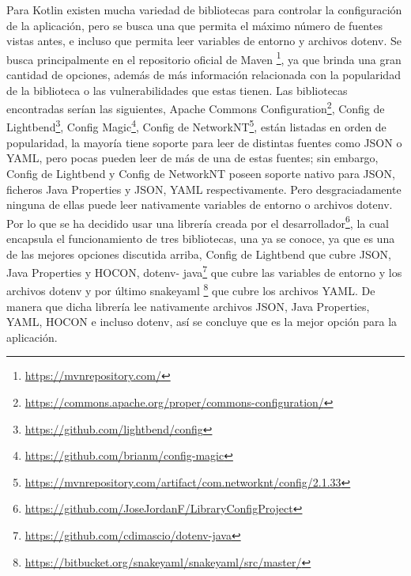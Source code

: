 Para Kotlin existen mucha variedad de bibliotecas para controlar la configuración de la aplicación, pero se busca 
una que permita el máximo número de fuentes vistas antes, e incluso que permita leer variables de entorno y archivos 
dotenv. Se busca principalmente en el repositorio oficial de Maven \footnote{\url{https://mvnrepository.com/}}, ya 
que brinda una gran cantidad de opciones, además de más información relacionada con la popularidad de la biblioteca 
o las vulnerabilidades que estas tienen. Las bibliotecas encontradas serían las siguientes, Apache Commons 
Configuration\footnote{\url{https://commons.apache.org/proper/commons-configuration/}}, Config de 
Lightbend\footnote{\url{https://github.com/lightbend/config}}, Config 
Magic\footnote{\url{https://github.com/brianm/config-magic}}, Config de 
NetworkNT\footnote{\url{https://mvnrepository.com/artifact/com.networknt/config/2.1.33}}, están listadas en orden de 
popularidad, la mayoría tiene soporte para leer de distintas fuentes como JSON o YAML, pero pocas pueden leer de más
de una de estas fuentes; sin embargo, Config de Lightbend y  Config de NetworkNT poseen soporte nativo para JSON, 
ficheros Java Properties y JSON, YAML respectivamente. Pero desgraciadamente ninguna de ellas puede leer nativamente 
variables de entorno o archivos dotenv. Por lo que se ha decidido usar una librería creada por el 
desarrollador\footnote{\url{https://github.com/JoseJordanF/LibraryConfigProject}}, la 
cual encapsula el funcionamiento de tres bibliotecas, una ya se conoce, ya que es una de las mejores opciones 
discutida arriba, Config de Lightbend que cubre JSON, Java Properties y HOCON, dotenv-
java\footnote{\url{https://github.com/cdimascio/dotenv-java}} que cubre las variables de entorno y los archivos 
dotenv y por último snakeyaml \footnote{\url{https://bitbucket.org/snakeyaml/snakeyaml/src/master/}} que cubre los 
archivos YAML. De manera que dicha librería lee nativamente archivos JSON, Java Properties, YAML, HOCON e incluso 
dotenv, así se concluye que es la mejor opción para la aplicación.